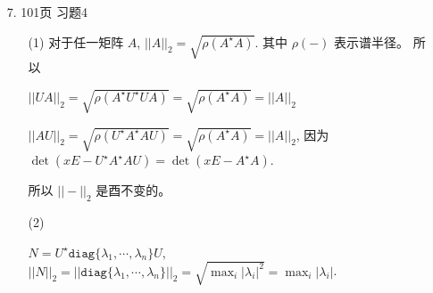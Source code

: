 \documentclass{article}
\begin{document}
\begin{spacing}{1.5}
\begin{itemize}
\begin{itemize}
    \end{itemize}
    

    \item [7.] 101页 习题4
    \begin{itemize}
        \item [(1)]
        对于任一矩阵 $A$, $||A||_2 = \sqrt{\rho(A^\star A)}$. 其中 $\rho(-)$ 表示谱半径。 所以 
    
        $||UA||_2=\sqrt{\rho(A^\star U^\star U A)} = \sqrt{\rho(A^\star A)} = ||A||_2$
    
        $||AU||_2 = \sqrt{\rho(U^\star A^\star A U)} = \sqrt{\rho(A^\star A)} = ||A||_2$, 因为 $\det(xE - U^\star A^\star AU) = \det(xE - A^\star A)$.
    
        所以 $||-||_2$ 是酉不变的。
        \item [(2)]
        
        $N = U^\star\mathtt{diag}\{\lambda_1,\cdots,\lambda_n\}U$, $||N||_2=||\mathtt{diag}\{\lambda_1,\cdots,\lambda_n\}||_2=\sqrt{\max_{i} |\lambda_i|^2} = \max_{i} |\lambda_i|$.
    \end{itemize}
    


\end{itemize}

\end{spacing}
\end{document}
